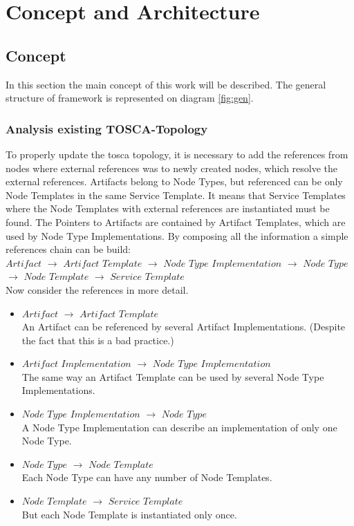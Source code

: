 
\chapter{Concept and Architecture}\label{chap:conarch}
\section{Concept}
In this section the main concept of this work will be described.
The general structure of framework is represented on diagram \ref{fig:gen}.



\subsection{Analysis existing TOSCA-Topology}\label{subs:analyse}
To properly update the \gls{tosca} topology, it is necessary to add the references from nodes where external references was to newly created nodes, which resolve the external references. 
Artifacts belong to Node Types, but referenced can be only Node Templates in the same Service Template.
It means that  Service Templates where the Node Templates with external references are instantiated must be found.
The Pointers to Artifacts are contained by Artifact Templates, which are used by Node Type Implementations.
By composing all the information a simple references chain can be build:\\
$Artifact$ $\rightarrow$ $Artifact$ $Template$ $\rightarrow$ $Node$ $Type$ $Implementation$ $\rightarrow$ $Node$ $Type$\\ $\rightarrow$ $Node$ $Template$ $\rightarrow$ $Service$ $Template$\\
Now consider the references in more detail. 
\begin{itemize}
	\item $Artifact$ $\rightarrow$ $Artifact$ $Template$\\
	An Artifact can be referenced by several Artifact Implementations. (Despite the fact that this is a bad practice.)
	\item  $Artifact$ $Implementation$ $\rightarrow$ $Node$ $Type$ $Implementation$ \\
	The same way an Artifact Template can be used by several Node Type Implementations.
	\item $Node$ $Type$ $Implementation$ $\rightarrow$ $Node$ $Type$ \\
	A Node Type Implementation can describe an implementation of only one Node Type.
	\item  $Node$ $Type$ $\rightarrow$ $Node$ $Template$\\
	Each Node Type can have any number of Node Templates.
	\item  $Node$ $Template$ $\rightarrow$ $Service$ $Template$\\
	But each Node Template is instantiated only once.
\end{itemize}
